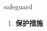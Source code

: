 
\begin{frame}
{\huge safeguard}
\begin{center}
\begin{enumerate}\Large
  \item \textbf{保护措施}
\end{enumerate}
\end{center}
\end{frame}
